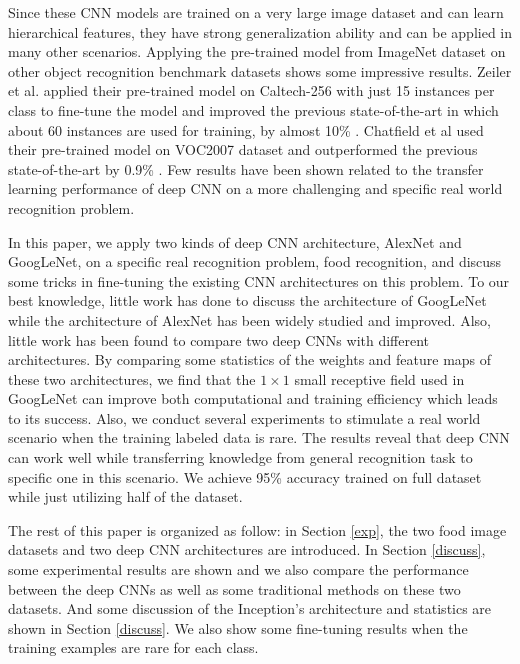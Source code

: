 Since these CNN models are trained on a very large image dataset and can learn hierarchical features, they have strong generalization ability and can be applied in many other scenarios. Applying the pre-trained model from ImageNet dataset on other object recognition benchmark datasets shows some impressive results.
Zeiler et al. applied their pre-trained model on Caltech-256 with just 15 instances per class to fine-tune the model and improved the previous state-of-the-art in which about 60 instances are used for training, by almost 10\% \cite{zeiler2014visualizing}.
Chatfield et al used their pre-trained model on VOC2007 dataset and outperformed the previous state-of-the-art by 0.9\% \cite{Chatfield14}.
Few results have been shown related to the transfer learning performance of deep CNN on a more challenging and specific real world recognition problem.

In this paper, we apply two kinds of deep CNN architecture, AlexNet and GoogLeNet, on a specific real recognition problem, food recognition, and discuss some tricks in fine-tuning the existing CNN architectures on this problem. To our best knowledge, little work has done to discuss the architecture of GoogLeNet while the architecture of AlexNet has been widely studied and improved. Also, little work has been found to compare two deep CNNs with different architectures. By comparing some statistics of the weights and feature maps of these two architectures, we find that the $1\times 1$ small receptive field used in GoogLeNet can improve both computational and training efficiency which leads to its success.
Also, we conduct several experiments to stimulate a real world scenario when the training labeled data is rare. The results reveal that deep CNN can work well while transferring knowledge from general recognition task to specific one in this scenario. We achieve 95\% accuracy trained on full dataset while just utilizing half of the dataset.

The rest of this paper is organized as follow: in Section \ref{exp}, the two food image datasets and two deep CNN architectures are introduced. In Section \ref{discuss}, some experimental results are shown and we also compare the performance between the deep CNNs as well as some traditional methods on these two datasets. And some discussion of the Inception's architecture and statistics are shown in Section \ref{discuss}. We also show some fine-tuning results when the training examples are rare for each class.
